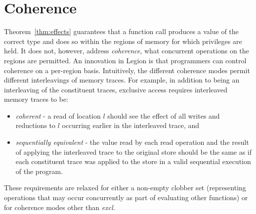 \section{Coherence}
\label{sec:coherence}

Theorem~\ref{thm:effects} guarantees that a function call produces a value of the
correct type and does so within the regions of memory for which privileges are held.
It does not, however, address {\em coherence}, what concurrent operations on the regions are permitted.
An innovation in Legion is that programmers can control coherence on a per-region basis.  Intuitively,
the different coherence modes permit different interleavings of memory traces.  For example,
in addition to being an interleaving of the constituent traces, exclusive access requires interleaved memory traces to be:
\begin{itemize}
\item {\em coherent} - a read of location $l$ should see the effect of all writes and reductions to $l$
occurring earlier in the interleaved trace, and
\item {\em sequentially equivalent} - the value read by each read 
operation and the result of applying the interleaved trace to the original store should be the same as if each constituent trace
was applied to the store in a valid sequential execution of the program.
\end{itemize}
These requirements are relaxed for either a non-empty clobber set (representing
operations that may occur concurrently as part of evaluating other functions) or for coherence
modes other than {\em excl}.

